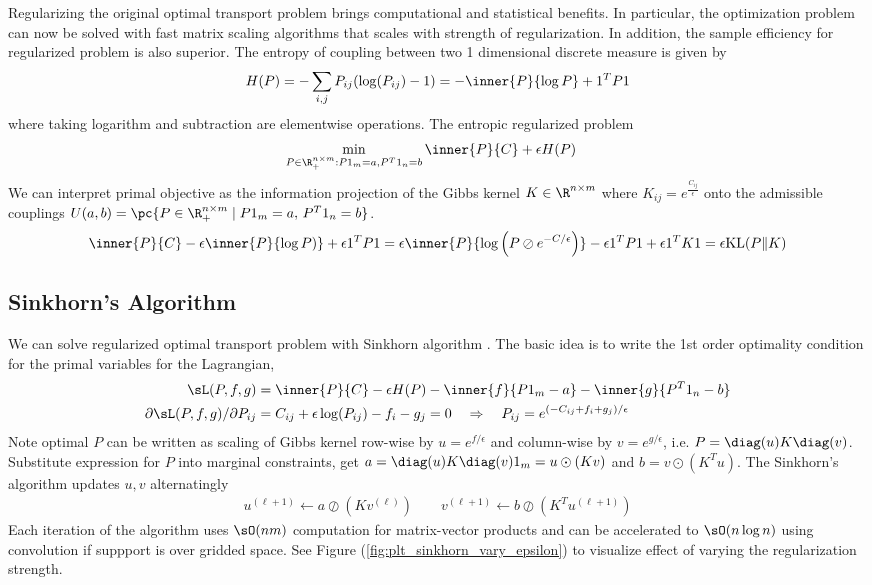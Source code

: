 \documentclass[11pt]{article}
\begin{document}
Regularizing the original optimal transport problem brings computational and statistical benefits. In particular, the optimization problem can now be solved with fast matrix scaling algorithms that scales with strength of regularization. In addition, the sample efficiency for regularized problem is also superior. The entropy of coupling between two 1 dimensional discrete measure is given by
\begin{align}
    H(P)
        = -\sum_{i,j} P_{ij}(\log(P_{ij})-1)
        = - \inner{P}{\log P} + 1^TP1
\end{align}
where taking logarithm and subtraction are elementwise operations. The entropic regularized problem
\begin{align}
    \min_{P\in\R^{n\times m}_+:P1_m=a,P^T1_n=b}\,
        &\inner{P}{C} + \epsilon H(P)
    \label{eq:opt_entropic_regularized_ot}
\end{align}
We can interpret primal objective as the information projection of the Gibbs kernel $K\in\R^{n\times m}$ where $K_{ij}=e^{\frac{C_{ij}}{\epsilon}}$ onto the admissible couplings $U(a,b)=\pc{P\in\R^{n\times m}_+\mid P1_m=a,\, P^T1_n=b}$.
\begin{align}
    \inner{P}{C} - \epsilon\inner{P}{\log P)} + \epsilon 1^T P 1
        = \epsilon \inner{P}{\log\left(P \oslash e^{-C/\epsilon} \right)} - \epsilon 1^TP1 + \epsilon 1^TK1
        = \epsilon \text{KL}(P\Vert K)
\end{align}

\subsection{Sinkhorn's Algorithm}

We can solve regularized optimal transport problem with Sinkhorn algorithm \cite{cuturiSinkhornDistancesLightspeed2013}. The basic idea is to write the 1st order optimality condition for the primal variables for the Lagrangian,
\begin{align}
    \sL(P,f,g)
        &= \inner{P}{C} - \epsilon H(P) - \inner{f}{P1_m-a}- \inner{g}{P^T1_n-b} \\
    \partial \sL(P,f,g)/\partial P_{ij}
        &= C_{ij} + \epsilon \log(P_{ij}) - f_i - g_j = 0
        \quad\Rightarrow\quad
        P_{ij} = e^{(-C_{ij}+f_i+g_j)/\epsilon}
\end{align}
Note optimal $P$ can be written as scaling of Gibbs kernel row-wise by $u=e^{f/\epsilon}$ and column-wise by $v=e^{g/\epsilon}$, i.e. $P=\diag(u)K \diag(v)$. Substitute expression for $P$ into marginal constraints, get $a = \diag(u) K \diag(v) 1_m = u\odot (Kv)$ and $b = v\odot (K^T u)$. The Sinkhorn's algorithm updates $u,v$ alternatingly
\begin{align}
    u^{(\ell+1)} 
        \leftarrow a \oslash (Kv^{(\ell)}) 
    \quad\quad
    v^{(\ell+1)}
        \leftarrow b \oslash (K^Tu^{(\ell+1)})
\end{align}
Each iteration of the algorithm uses $\sO(nm)$ computation for matrix-vector products and can be accelerated to $\sO(n\log n)$ using convolution if suppport is over gridded space. See Figure (\ref{fig:plt_sinkhorn_vary_epsilon}) to visualize effect of varying the regularization strength.
\end{document}
